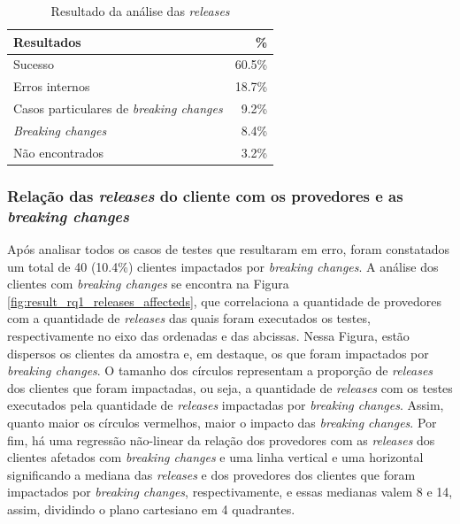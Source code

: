 \begin{table}[]
\centering
\begin{tabular}{lr}
\toprule
\textbf{Resultados}                & \textbf{\%} \\ \hline
Sucesso                                & 60.5\%      \\
Erros internos                         & 18.7\%      \\
Casos particulares de \textit{breaking changes} & 9.2\%       \\
\textit{Breaking changes}              & 8.4\%       \\
Não encontrados                        & 3.2\%       \\ \bottomrule
\end{tabular}\caption{Resultado da análise das \textit{releases}}
\label{tab:pre_res_rq1}
\end{table}

\subsubsection{Relação das \textit{releases} do cliente com os provedores e as \textit{breaking changes}}

Após analisar todos os casos de testes que resultaram em erro, foram constatados um total de 40 (10.4\%) clientes impactados por \textit{breaking changes}. A análise dos clientes com \textit{breaking changes} se encontra na Figura \ref{fig:result_rq1_releases_affecteds}, que correlaciona a quantidade de provedores com a quantidade de \textit{releases} das quais foram executados os testes, respectivamente no eixo das ordenadas e das abcissas. Nessa Figura, estão dispersos os clientes da amostra e, em destaque, os que foram impactados por \textit{breaking changes}. O tamanho dos círculos  representam a proporção de \textit{releases} dos clientes que foram impactadas, ou seja, a quantidade de \textit{releases} com os testes executados pela quantidade de \textit{releases} impactadas por \textit{breaking changes}. Assim, quanto maior os círculos vermelhos, maior o impacto das \textit{breaking changes}. Por fim, há uma regressão não-linear da relação dos provedores com as \textit{releases} dos clientes afetados com \textit{breaking changes} e uma linha vertical e uma horizontal significando a mediana das \textit{releases} e dos provedores dos clientes que foram impactados por \textit{breaking changes}, respectivamente, e essas medianas valem 8 e 14, assim, dividindo o plano cartesiano em 4 quadrantes.

